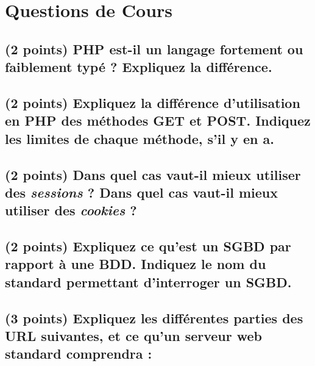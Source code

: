 \documentclass[11pt,a4paper]{article}
\begin{document}
\MakeExamTitle                   %


\section{Questions de Cours}

\subsection{(2 points) PHP est-il un langage fortement ou faiblement typé ? Expliquez la différence.}

\bigskip
\bigskip
\bigskip
\bigskip
\bigskip
\bigskip
\bigskip
\bigskip
\bigskip

\subsection{(2 points) Expliquez la différence d'utilisation en PHP des méthodes GET et POST. Indiquez les limites de chaque méthode, s'il y en a.}

\bigskip
\bigskip
\bigskip
\bigskip
\bigskip
\bigskip
\bigskip
\bigskip
\bigskip

\subsection{(2 points) Dans quel cas vaut-il mieux utiliser des \textit{sessions} ? Dans quel cas vaut-il mieux utiliser des \textit{cookies} ?}

\bigskip
\bigskip
\bigskip
\bigskip
\bigskip
\bigskip
\bigskip
\bigskip
\bigskip

\subsection{(2 points) Expliquez ce qu'est un SGBD par rapport à une BDD. Indiquez le nom du standard permettant d'interroger un SGBD.}

\bigskip
\bigskip
\bigskip
\bigskip
\bigskip
\bigskip
\bigskip
\bigskip
\bigskip

\newpage

\subsection{(3 points) Expliquez les différentes parties des URL suivantes, et ce qu'un serveur web standard comprendra :}
\end{document}
